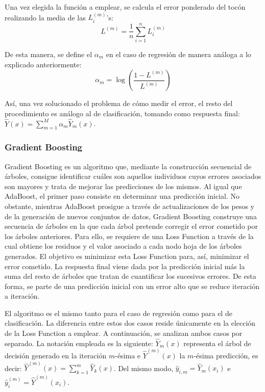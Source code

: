 \documentclass[12pt,twoside]{article}
\begin{document}
Una vez elegida la función a emplear, se calcula el error ponderado del tocón realizando la media de las $L_i^{(m)}$'s:
\begin{equation*}
L^{(m)} = \frac{1}{n}\sum_{i=1}^n L_i^{(m)}
\end{equation*}

De esta manera, se define el $\alpha_m$ en el caso de regresión de manera análoga a lo explicado anteriormente:
\begin{equation*}
\alpha_m = \log \left( \frac{1 - L^{(m)}}{L^{(m)}} \right)
\end{equation*}

Así, una vez solucionado el problema de cómo medir el error, el resto del procedimiento es análogo al de clasificación, tomando como respuesta final: $\hat{Y}(x) = \sum_{m = 1} ^M \alpha_m \hat{Y}_m(x)$.





\subsubsection{Gradient Boosting} \label{sec:GB}

Gradient Boosting \cite{FR03} es un algoritmo que, mediante la construcción secuencial de árboles, consigue identificar cuáles son aquellos individuos cuyos errores asociados son mayores y trata de mejorar las predicciones de los mismos. Al igual que AdaBoost, el primer paso consiste en determinar una predicción inicial. No obstante, mientras AdaBoost prosigue a través de actualizaciones de los pesos y de la generación de nuevos conjuntos de datos, Gradient Boosting construye una secuencia de árboles en la que cada árbol pretende corregir el error cometido por los árboles anteriores. Para ello, se requiere de una Loss Function a través de la cual obtiene los residuos y el valor asociado a cada nodo hoja de los árboles generados. El objetivo es minimizar esta Loss Function para, así, minimizar el error cometido. La respuesta final viene dada por la predicción inicial más la suma del resto de árboles que tratan de cuantificar los sucesivos errores. De esta forma, se parte de una predicción inicial con un error alto que se reduce iteración a iteración.

El algoritmo es el mismo tanto para el caso de regresión como para el de clasificación. La diferencia entre estos dos casos reside únicamente en la elección de la Loss Function a emplear. A continuación, se analizan ambos casos por separado. La notación empleada es la siguiente: $\hat{Y}_m(x)$ representa el árbol de decisión generado en la iteración $m$-ésima e $\hat{Y}^{(m)}(x)$ la $m$-ésima predicción, es decir: $\hat{Y}^{(m)}(x) = \displaystyle \sum_{k=1}^m \hat{Y}_k(x)$. Del mismo modo, $\hat{y}_{i,m} = \hat{Y}_m(x_i)$ e $\hat{y}_i^{(m)} = \hat{Y}^{(m)}(x_i)$.
\end{document}
